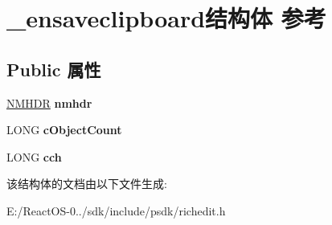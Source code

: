 \hypertarget{struct__ensaveclipboard}{}\section{\+\_\+ensaveclipboard结构体 参考}
\label{struct__ensaveclipboard}
\subsection*{Public 属性}
\begin{DoxyCompactItemize}
\item 
\mbox{\label{struct__ensaveclipboard_a7eaf97194ccf01eb76c7e9fda33f075f}} 
\hyperlink{structtag_n_m_h_d_r}{N\+M\+H\+DR} {\bfseries nmhdr}
\item 
\mbox{\label{struct__ensaveclipboard_a0b3d541a6f0b5c5cac1152c987265f12}} 
L\+O\+NG {\bfseries c\+Object\+Count}
\item 
\mbox{\label{struct__ensaveclipboard_a8c75471d4ff5b10539c10e2906ed5031}} 
L\+O\+NG {\bfseries cch}
\end{DoxyCompactItemize}


该结构体的文档由以下文件生成\+:\begin{DoxyCompactItemize}
\item 
E\+:/\+React\+O\+S-\/0../sdk/include/psdk/richedit.\+h\end{DoxyCompactItemize}
